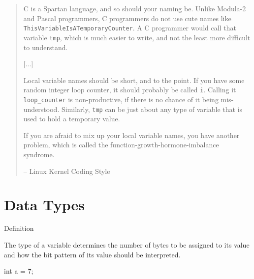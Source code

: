 \documentclass[compress]{beamer}
\begin{document}
\begin{slide}
	\begin{quotation} \scriptsize \normalfont

	C is a Spartan language, and so should your naming be.
	Unlike Modula-2 and Pascal programmers, C programmers do not use cute names like \alert{\texttt{ThisVariableIsATemporaryCounter}}.
	A C programmer would call that variable \alert{\texttt{tmp}}, which is much easier to write, and not the least more difficult to understand.

	[...]

	Local variable names should be short, and to the point.
	If you have some random integer loop counter, it should probably be called \alert{\texttt{i}}.
	Calling it \alert{\texttt{loop\_counter}} is non-productive, if there is no chance of it being mis-understood.
	Similarly, \alert{\texttt{tmp}} can be just about any type of variable that is used to hold a temporary value.

	If you are afraid to mix up your local variable names, you have another problem, which is called the function-growth-hormone-imbalance syndrome.

	\begin{flushright}-- Linux Kernel Coding Style\end{flushright}

	\end{quotation}
\end{slide}

\section{Data Types}

\begin{slide}
	\begin{block}{Definition}

	The type of a variable determines the number of bytes to be assigned to its value and how the bit pattern of its value should be interpreted.

	\begin{terminal}
	int a = 7;
	\end{terminal}

	\end{block}
\end{slide}
\end{document}
